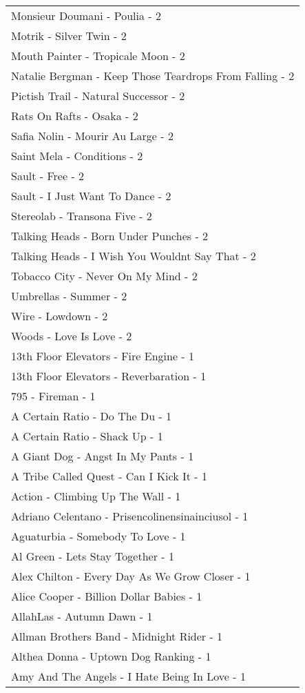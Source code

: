 \documentclass[
]{article}
\begin{document}
\begin{longtable}{l}
Monsieur Doumani - Poulia - 2 \\ 
Motrik - Silver Twin - 2 \\ 
Mouth Painter - Tropicale Moon - 2 \\ 
Natalie Bergman - Keep Those Teardrops From Falling - 2 \\ 
Pictish Trail - Natural Successor - 2 \\ 
Rats On Rafts - Osaka - 2 \\ 
Safia Nolin - Mourir Au Large - 2 \\ 
Saint Mela - Conditions - 2 \\ 
Sault - Free - 2 \\ 
Sault - I Just Want To Dance - 2 \\ 
Stereolab - Transona Five - 2 \\ 
Talking Heads - Born Under Punches - 2 \\ 
Talking Heads - I Wish You Wouldnt Say That - 2 \\ 
Tobacco City - Never On My Mind - 2 \\ 
Umbrellas - Summer - 2 \\ 
Wire - Lowdown - 2 \\ 
Woods - Love Is Love - 2 \\ 
13th Floor Elevators - Fire Engine - 1 \\ 
13th Floor Elevators - Reverbaration - 1 \\ 
795 - Fireman - 1 \\ 
A Certain Ratio - Do The Du - 1 \\ 
A Certain Ratio - Shack Up - 1 \\ 
A Giant Dog - Angst In My Pants - 1 \\ 
A Tribe Called Quest - Can I Kick It - 1 \\ 
Action - Climbing Up The Wall - 1 \\ 
Adriano Celentano - Prisencolinensinainciusol - 1 \\ 
Aguaturbia - Somebody To Love - 1 \\ 
Al Green - Lets Stay Together - 1 \\ 
Alex Chilton - Every Day As We Grow Closer - 1 \\ 
Alice Cooper - Billion Dollar Babies - 1 \\ 
AllahLas - Autumn Dawn - 1 \\ 
Allman Brothers Band - Midnight Rider - 1 \\ 
Althea Donna - Uptown Dog Ranking - 1 \\ 
Amy And The Angels - I Hate Being In Love - 1 \\ 

\end{longtable}
\end{document}
